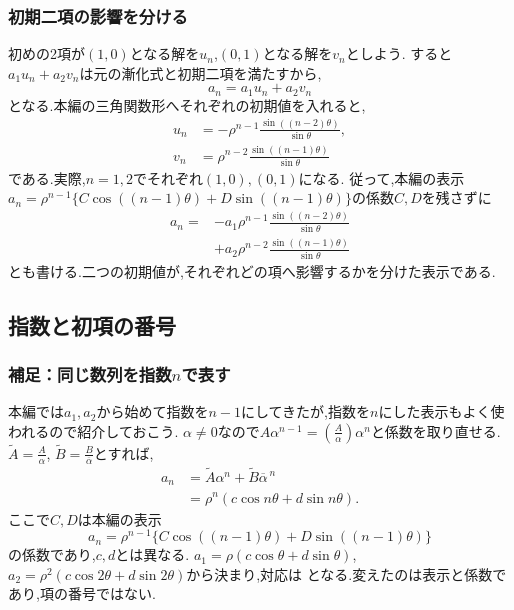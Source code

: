 \subsubsection{初期二項の影響を分ける}
初めの2項が$(1,0)$となる解を$u_n$,$(0,1)$となる解を$v_n$としよう.
すると$a_1u_n+a_2v_n$は元の漸化式と初期二項を満たすから,
\[
  a_n=a_1u_n+a_2v_n
\]
となる.本編の三角関数形へそれぞれの初期値を入れると,
\[
  \begin{aligned}
    u_n&=-\rho^{n-1}\frac{\sin((n-2)\theta)}{\sin\theta},\\
    v_n&=\rho^{n-2}\frac{\sin((n-1)\theta)}{\sin\theta}
  \end{aligned}
\]
である.実際,$n=1,2$でそれぞれ$(1,0),(0,1)$になる.
従って,本編の表示$a_n=\rho^{n-1}\{C\cos((n-1)\theta)+D\sin((n-1)\theta)\}$の係数$C,D$を残さずに
\[
  \begin{aligned}
    a_n={}&-a_1\rho^{n-1}\frac{\sin((n-2)\theta)}{\sin\theta}\\
          &+a_2\rho^{n-2}\frac{\sin((n-1)\theta)}{\sin\theta}
  \end{aligned}
\]
とも書ける.二つの初期値が,それぞれどの項へ影響するかを分けた表示である.

\subsection{指数と初項の番号}
\subsubsection{補足：同じ数列を指数$n$で表す}
本編では$a_1,a_2$から始めて指数を$n-1$にしてきたが,指数を$n$にした表示もよく使われるので紹介しておこう.
$\alpha\ne0$なので$A\alpha^{n-1}=\left(\frac{A}{\alpha}\right)\alpha^n$と係数を取り直せる.
$\widetilde A=\frac{A}{\alpha}$, $\widetilde B=\frac{B}{\overline\alpha}$とすれば,
\[
  \begin{aligned}
    a_n&=\widetilde A\alpha^n+\widetilde B\overline\alpha^{\,n}\\
    &=\rho^n(c\cos n\theta+d\sin n\theta).
  \end{aligned}
\]
ここで$C,D$は本編の表示
\[
  a_n=\rho^{n-1}\{C\cos((n-1)\theta)+D\sin((n-1)\theta)\}
\]
の係数であり,$c,d$とは異なる.
$a_1=\rho(c\cos\theta+d\sin\theta)$,
$a_2=\rho^2(c\cos2\theta+d\sin2\theta)$から決まり,対応は
\BookMathLayout{\[
    c=\frac{C\cos\theta-D\sin\theta}{\rho},\qquad
    d=\frac{C\sin\theta+D\cos\theta}{\rho}
  \]}{\[
    \begin{aligned}
      c&=\frac{C\cos\theta-D\sin\theta}{\rho},\\
      d&=\frac{C\sin\theta+D\cos\theta}{\rho}
    \end{aligned}
  \]}
となる.変えたのは表示と係数であり,項の番号ではない.

